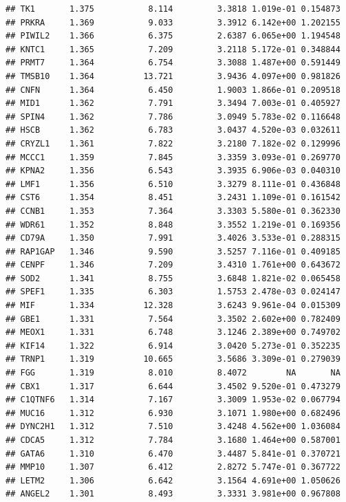 \documentclass{article}\usepackage[]{graphicx}\usepackage[]{color}
\makeatletter
\newenvironment{kframe}{%
 \def\at@end@of@kframe{}%
 \ifinner\ifhmode%
  \def\at@end@of@kframe{\end{minipage}}%
  \begin{minipage}{\columnwidth}%
 \fi\fi%
 \def\FrameCommand##1{\hskip\@totalleftmargin \hskip-\fboxsep
 \colorbox{shadecolor}{##1}\hskip-\fboxsep
     \hskip-\linewidth \hskip-\@totalleftmargin \hskip\columnwidth}%
 \MakeFramed {\advance\hsize-\width
   \@totalleftmargin\z@ \linewidth\hsize
   \@setminipage}}%
 {\par\unskip\endMakeFramed%
 \at@end@of@kframe}
\newenvironment{knitrout}{}{} %
\makeatother
\begin{document}
\begin{knitrout}
\begin{kframe}
\begin{verbatim}
## TK1       1.375           8.114         3.3818 1.019e-01 0.154873
## PRKRA     1.369           9.033         3.3912 6.142e+00 1.202155
## PIWIL2    1.366           6.375         2.6387 6.065e+00 1.194548
## KNTC1     1.365           7.209         3.2118 5.172e-01 0.348844
## PRMT7     1.364           6.754         3.3088 1.487e+00 0.591449
## TMSB10    1.364          13.721         3.9436 4.097e+00 0.981826
## CNFN      1.364           6.450         1.9003 1.866e-01 0.209518
## MID1      1.362           7.791         3.3494 7.003e-01 0.405927
## SPIN4     1.362           7.786         3.0949 5.783e-02 0.116648
## HSCB      1.362           6.783         3.0437 4.520e-03 0.032611
## CRYZL1    1.361           7.822         3.2180 7.182e-02 0.129996
## MCCC1     1.359           7.845         3.3359 3.093e-01 0.269770
## KPNA2     1.356           6.543         3.3935 6.906e-03 0.040310
## LMF1      1.356           6.510         3.3279 8.111e-01 0.436848
## CST6      1.354           8.451         3.2431 1.109e-01 0.161542
## CCNB1     1.353           7.364         3.3303 5.580e-01 0.362330
## WDR61     1.352           8.848         3.3552 1.219e-01 0.169356
## CD79A     1.350           7.991         3.4026 3.533e-01 0.288315
## RAP1GAP   1.346           9.590         3.5257 7.116e-01 0.409185
## CENPF     1.346           7.209         3.4310 1.761e+00 0.643672
## SOD2      1.341           8.755         3.6848 1.821e-02 0.065458
## SPEF1     1.335           6.303         1.5753 2.478e-03 0.024147
## MIF       1.334          12.328         3.6243 9.961e-04 0.015309
## GBE1      1.331           7.564         3.3502 2.602e+00 0.782409
## MEOX1     1.331           6.748         3.1246 2.389e+00 0.749702
## KIF14     1.322           6.914         3.0420 5.273e-01 0.352235
## TRNP1     1.319          10.665         3.5686 3.309e-01 0.279039
## FGG       1.319           8.010         8.4072        NA       NA
## CBX1      1.317           6.644         3.4502 9.520e-01 0.473279
## C1QTNF6   1.314           7.167         3.3009 1.953e-02 0.067794
## MUC16     1.312           6.930         3.1071 1.980e+00 0.682496
## DYNC2H1   1.312           7.510         3.4248 4.562e+00 1.036084
## CDCA5     1.312           7.784         3.1680 1.464e+00 0.587001
## GATA6     1.310           6.470         3.4487 5.841e-01 0.370721
## MMP10     1.307           6.412         2.8272 5.747e-01 0.367722
## LETM2     1.306           6.642         3.1564 4.691e+00 1.050626
## ANGEL2    1.301           8.493         3.3331 3.981e+00 0.967808
\end{verbatim}

\end{kframe}
\end{knitrout}
\end{document}
